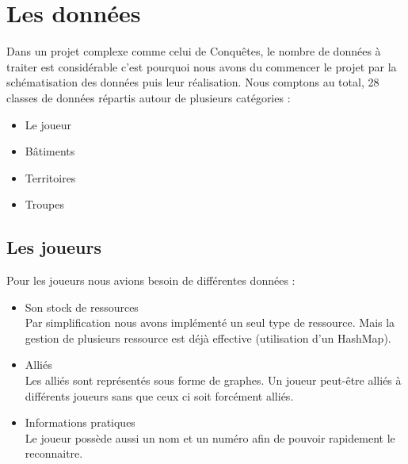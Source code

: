 \section{Les données}
  Dans un projet complexe comme celui de Conquêtes, le nombre de données à traiter est considérable c'est pourquoi nous avons du commencer le projet par la schématisation 
  des données puis leur réalisation.
  Nous comptons au total, 28 classes de données répartis autour de plusieurs catégories :
  \begin{itemize}
    \item Le joueur
    \item Bâtiments
    \item Territoires
    \item Troupes
  \end{itemize}
  
  \subsection{Les joueurs}
    Pour les joueurs nous avions besoin de différentes données :
    \begin{itemize}
      \item Son stock de ressources \\
	Par simplification nous avons implémenté un seul type de ressource. Mais la gestion de plusieurs ressource est déjà effective (utilisation d'un HashMap).
      \item Alliés \\
	Les alliés sont représentés sous forme de graphes. Un joueur peut-être alliés à différents joueurs sans que ceux ci soit forcément alliés.
      \item Informations pratiques \\
	Le joueur possède aussi un nom et un numéro afin de pouvoir rapidement le reconnaitre.
    \end{itemize}
  
